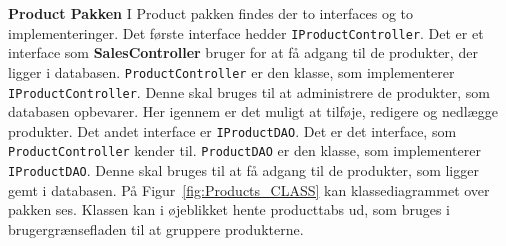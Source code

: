 \textbf{Product Pakken}\newline
I Product pakken findes der to interfaces og to implementeringer. Det første interface hedder \texttt{IProductController}. Det er et interface som \textbf{SalesController} bruger for at få adgang til de produkter, der ligger i databasen. \texttt{ProductController} er den klasse, som implementerer \texttt{IProductController}. Denne skal bruges til at administrere de produkter, som databasen opbevarer. Her igennem er det muligt at tilføje, redigere og nedlægge produkter. 
\newline\newline
Det andet interface er \texttt{IProductDAO}. Det er det interface, som \texttt{ProductController} kender til. \texttt{ProductDAO} er den klasse, som implementerer \texttt{IProductDAO}. Denne skal bruges til at få adgang til de produkter, som ligger gemt i databasen. På Figur~\ref{fig:Products_CLASS} kan klassediagrammet over pakken ses. Klassen kan i øjeblikket hente producttabs ud, som bruges i brugergrænsefladen til at gruppere produkterne.

